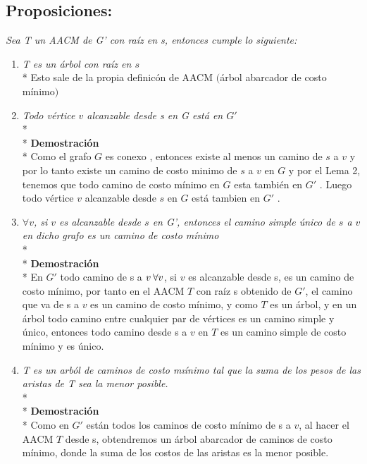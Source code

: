 \documentclass{article}
\begin{document}
    \subsection{Proposiciones:}
    
    \noindent \textit{Sea T un AACM de G' con ra\'iz en s, entonces cumple lo siguiente:}

    \begin{enumerate}
        \item  \textit{T es un \'arbol con ra\'iz en $s$}
        \\*
        Esto sale de la propia definic\'on de AACM $($\'arbol abarcador de costo m\'inimo$)$
        
        \vspace*{0.3cm}

        \item \textit{Todo v\'ertice $v$ alcanzable desde s en G est\'a en $G'$}
        \\*
        \\*
        \textbf{Demostraci\'on } 
        \\*
        Como el grafo $G$ es conexo , entonces existe al menos un camino de $s$ a $v$ y por lo tanto existe un camino de costo minimo 
        de $s$ a $v$ en $G$ y por el Lema 2, tenemos que todo camino de costo m\'inimo en $G$ esta tambi\'en en $G'$ . Luego todo v\'ertice 
        $v$ alcanzable desde $s$ en $G$ est\'a tambien en $G'$ . 
        
        \vspace*{0.3cm} 

        \item \textit{$\forall v$, si $v$ es alcanzable desde $s$ en G', entonces el camino simple \'unico de $s$ a $v$ en dicho grafo es un camino de costo m\'inimo}
        \\*
        \\*
        \textbf{Demostraci\'on } 
        \\*
        En $G'$ todo camino  de s a $v \hspace{0.2em}\forall v$, si $v$ es alcanzable desde s, es un camino de costo m\'inimo, por tanto en el AACM $T$ con ra\'iz s obtenido
        de $G'$, el camino que va de s a $v$ es un camino de costo m\'inimo, y como $T$ es un \'arbol, y en un \'arbol todo camino entre cualquier 
        par de v\'ertices es un camino simple y \'unico, entonces todo camino desde s a $v$ en $T$ es un camino simple de costo m\'inimo y es \'unico.
        \item  \textit{T es un arb\'ol de caminos de costo mı\'inimo tal que la suma de los pesos de las aristas de T sea la menor posible.}
        \\*
        \\*
        \textbf{Demostraci\'on } 
        \\*
        Como en $G'$ est\'an todos los caminos de costo m\'inimo de s a $v$, al hacer el AACM $T$ desde s, obtendremos un \'arbol abarcador de
        caminos de costo m\'inimo, donde la suma de los costos de las aristas es la menor posible.\\
    \end{enumerate}    
\end{document}
